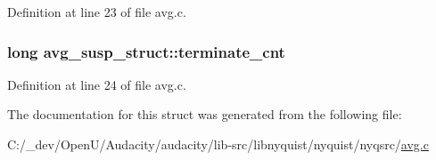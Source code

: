 Definition at line 23 of file avg.\+c.

\subsubsection[{\texorpdfstring{terminate\+\_\+cnt}{terminate_cnt}}]{\setlength{\rightskip}{0pt plus 5cm}long avg\+\_\+susp\+\_\+struct\+::terminate\+\_\+cnt}\hypertarget{structavg__susp__struct_a1d06d493cddf115531181eea3e891bd0}{}\label{structavg__susp__struct_a1d06d493cddf115531181eea3e891bd0}


Definition at line 24 of file avg.\+c.



The documentation for this struct was generated from the following file\+:\begin{DoxyCompactItemize}
\item 
C\+:/\+\_\+dev/\+Open\+U/\+Audacity/audacity/lib-\/src/libnyquist/nyquist/nyqsrc/\hyperlink{avg_8c}{avg.\+c}\end{DoxyCompactItemize}
